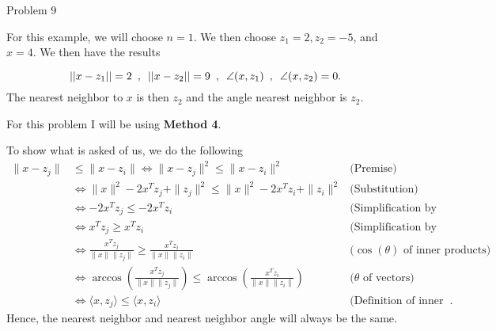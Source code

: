 \begin{problem}{Problem 9}
\begin{highlight}
        For this example, we will choose $n = 1$. We then choose $z_{1} = 2, z_{2} = -5$, and $x = 4$. We then have the results

        \setcounter{equation}{0}
        \begin{equation}
            ||x - z_{1}|| = 2 \hspace*{5pt} , \hspace*{5pt} ||x - z_{2}|| = 9 \hspace*{5pt} , \hspace*{5pt} \angle(x,z_{1}) \hspace*{5pt} , \hspace*{5pt} \angle(x,z_{2}) = 0.
        \end{equation}
        The nearest neighbor to $x$ is then $z_{2}$ and the angle nearest neighbor is $z_{2}$.
    \end{highlight}

    \begin{highlight}
        For this problem I will be using \textbf{Method 4}. \vspace*{1em}

        To show what is asked of us, we do the following
        \begin{align}
            \|x - z_j\| &\leq \|x - z_i\| \Leftrightarrow \|x - z_j\|^2 \leq \|x - z_i\|^2 & \text{(Premise)} \\
            &\Leftrightarrow \|x\|^2 - 2x^Tz_j + \|z_j\|^2 \leq \|x\|^2 - 2x^Tz_i + \|z_i\|^2 & \text{(Substitution)} \\
            &\Leftrightarrow -2x^Tz_j \leq -2x^Tz_i & \text{(Simplification by subtraction)} \\
            &\Leftrightarrow x^Tz_j \geq x^Tz_i & \text{(Simplification by division)} \\
            &\Leftrightarrow \frac{x^Tz_j}{\|x\|\|z_j\|} \geq \frac{x^Tz_i}{\|x\|\|z_i\|} & \text{($\cos{(\theta)}$ of inner products)} \\
            &\Leftrightarrow \arccos\left(\frac{x^Tz_j}{\|x\|\|z_j\|}\right) \leq \arccos\left(\frac{x^Tz_i}{\|x\|\|z_i\|}\right) & \text{($\theta$ of vectors)} \\
            &\Leftrightarrow \langle x, z_j \rangle \leq \langle x, z_i \rangle & \text{(Definition of inner product)}.
        \end{align}
        Hence, the nearest neighbor and nearest neighbor angle will always be the same.   
    \end{highlight}
\end{problem}


